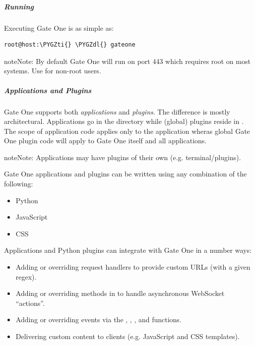 \documentclass[letterpaper,10pt,openany]{sphinxmanual}
\def\PYGZdl{\char`\$}
\def\PYGZti{\char`\~}
\begin{document}
\subparagraph{Running}
\label{Developer/server:running}
Executing Gate One is as simple as:

\begin{Verbatim}[commandchars=\\\{\}]
root@host:\PYGZti{} \PYGZdl{} gateone
\end{Verbatim}

\begin{notice}{note}{Note:}
By default Gate One will run on port 443 which requires root on most
systems.  Use  for non-root users.
\end{notice}


\subparagraph{Applications and Plugins}
\label{Developer/server:applications-and-plugins}
Gate One supports both \emph{applications} and \emph{plugins}.  The difference is mostly
architectural.  Applications go in the  directory while
(global) plugins reside in .  The scope of application code
applies only to the application wheras global Gate One plugin code will apply
to Gate One itself and all applications.

\begin{notice}{note}{Note:}
Applications may have plugins of their own (e.g. terminal/plugins).
\end{notice}

Gate One applications and plugins can be written using any combination of the
following:
\begin{itemize}
\item {} 
Python

\item {} 
JavaScript

\item {} 
CSS

\end{itemize}

Applications and Python plugins can integrate with Gate One in a number ways:
\begin{itemize}
\item {} 
Adding or overriding request handlers to provide custom URLs (with a given regex).

\item {} 
Adding or overriding methods in {\hyperref[Developer/server:gateone.core.server.GOApplication]{}} to handle asynchronous WebSocket ``actions''.

\item {} 
Adding or overriding events via the , , , and  functions.

\item {} 
Delivering custom content to clients (e.g. JavaScript and CSS templates).

\end{itemize}
\end{document}
